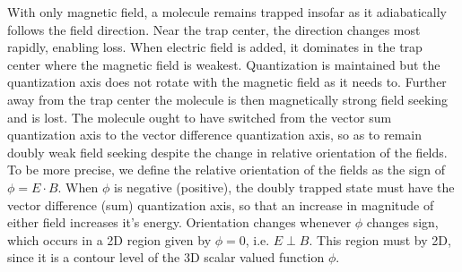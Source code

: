 \documentclass[%
 reprint,
groupedaddress,
 amsmath,amssymb,
 aps,
prl,
]{revtex4-1}
\newcommand{\epb}{$E\!\perp\!B$}
\begin{document}
With only magnetic field, a molecule remains trapped insofar as it adiabatically follows the field direction. Near the trap center, the direction changes most rapidly, enabling loss. When electric field is added, it dominates in the trap center where the magnetic field is weakest. Quantization is maintained but the quantization axis does not rotate with the magnetic field as it needs to. Further away from the trap center the molecule is then magnetically strong field seeking and is lost. The molecule ought to have switched from the vector sum quantization axis to the vector difference quantization axis, so as to remain doubly weak field seeking despite the change in relative orientation of the fields. To be more precise, we define the relative orientation of the fields as the sign of $\phi=E\cdot B$. When $\phi$ is negative (positive), the doubly trapped state must have the vector difference (sum) quantization axis, so that an increase in magnitude of either field increases it's energy. Orientation changes whenever $\phi$ changes sign, which occurs in a 2D region given by $\phi=0$, i.e. \epb. This region must by 2D, since it is a contour level of the 3D scalar valued function $\phi$. %
\end{document}
